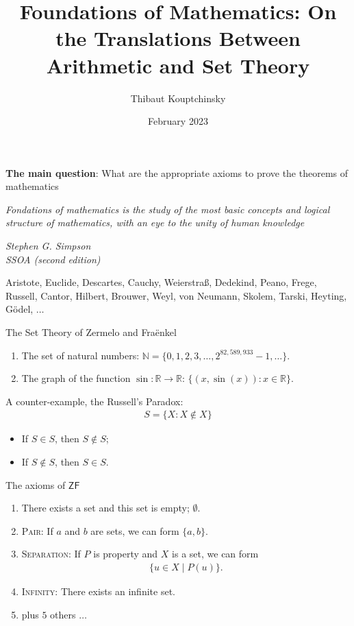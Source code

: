 \documentclass{beamer} %
\title[Arithmetic and Set Theory]{Foundations of Mathematics: On the Translations Between 
Arithmetic and Set Theory}
\institute[COLABS]{COLABS Tohoku University \and UCLouvain}
\author{Thibaut Kouptchinsky}
\date{February 2023}
\begin{document}
\begin{frame}[plain]
	\titlepage
\end{frame}

\begin{frame}{\textbf{The main question}: What are the appropriate axioms to prove the theorems of mathematics }

        \epigraph{\textit{Fondations of mathematics is the study of the most basic concepts 
        and logical structure of mathematics, with an eye to the unity of human knowledge}}{\textit{Stephen G. Simpson \\ SSOA (second edition)}}
\pause Aristote, Euclide, Descartes, Cauchy, Weierstraß, Dedekind, Peano, Frege, Russell, 
Cantor, Hilbert, Brouwer, Weyl, von Neumann, Skolem, Tarski, Heyting, Gödel, $\dots$
\end{frame}

\begin{frame}{The Set Theory of Zermelo and Fraënkel}
    \begin{example}
         \begin{enumerate}
            \item<1-> The set of natural numbers: $\mathbb{N} = \{0, 1, 2, 3, \dots, 2^{82,589,933}-1, \dots \}$.
            \item<2-> The graph of the function $\sin \colon \mathbb{R} \to \mathbb{R}$: $\{(x,\sin(x)) : x \in \mathbb{R}\}$.
        \end{enumerate}
    \end{example}
    \pause 
    \pause 
    A counter-example, the Russell's Paradox: \begin{align*}
        S = \{ X : X \not\in X\}
    \end{align*}
    \begin{itemize}
        \item<5-> If $S \in S$, then $S \not\in S$;
        \item<6-> If $S \not\in S$, then $S \in S$. 
    \end{itemize}
\end{frame}

\begin{frame}{The axioms of $\mathsf{ZF}$}
    \begin{enumerate}
        \item<1-> There exists a set and this set is empty; $\emptyset$.
        \item<2-> \textsc{Pair}: If $a$ and $b$ are sets, we can form $\{a,b\}$.
        \item<3-> \textsc{Separation}: If $P$ is property and $X$ is a set, we can form \begin{align*}
            \{u \in X \mid P(u)\}.    
        \end{align*}
        \item<4-> \textsc{Infinity}: There exists an infinite set.
        \item<5-> plus $5$ others $\dots$ 
    \end{enumerate}
\end{frame}
\end{document}
